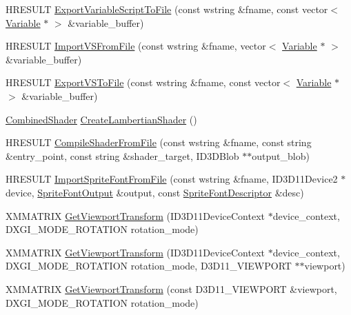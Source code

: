 \begin{DoxyCompactItemize}
H\+R\+E\+S\+U\+LT \hyperlink{namespacemage_a6bbe2c1ce9b49dea0c61ce4eafea6a3d}{Export\+Variable\+Script\+To\+File} (const wstring \&fname, const vector$<$ \hyperlink{structmage_1_1_variable}{Variable} $\ast$ $>$ \&variable\+\_\+buffer)
\item 
H\+R\+E\+S\+U\+LT \hyperlink{namespacemage_ab13ac77392ebda63780e73f720237906}{Import\+V\+S\+From\+File} (const wstring \&fname, vector$<$ \hyperlink{structmage_1_1_variable}{Variable} $\ast$ $>$ \&variable\+\_\+buffer)
\item 
H\+R\+E\+S\+U\+LT \hyperlink{namespacemage_af5780face7eadab7a08f015e3516e137}{Export\+V\+S\+To\+File} (const wstring \&fname, const vector$<$ \hyperlink{structmage_1_1_variable}{Variable} $\ast$ $>$ \&variable\+\_\+buffer)
\item 
\hyperlink{structmage_1_1_combined_shader}{Combined\+Shader} \hyperlink{namespacemage_ab0bd21012fa29244f0f9b3201bebc2a5}{Create\+Lambertian\+Shader} ()
\item 
H\+R\+E\+S\+U\+LT \hyperlink{namespacemage_af63dbc237d243bcad8b6f2c0a9bb9163}{Compile\+Shader\+From\+File} (const wstring \&fname, const string \&entry\+\_\+point, const string \&shader\+\_\+target, I\+D3\+D\+Blob $\ast$$\ast$output\+\_\+blob)
\item 
H\+R\+E\+S\+U\+LT \hyperlink{namespacemage_a08f20ffe7bbb23d861ab2442e2967bcd}{Import\+Sprite\+Font\+From\+File} (const wstring \&fname, I\+D3\+D11\+Device2 $\ast$device, \hyperlink{structmage_1_1_sprite_font_output}{Sprite\+Font\+Output} \&output, const \hyperlink{structmage_1_1_sprite_font_descriptor}{Sprite\+Font\+Descriptor} \&desc)
\item 
X\+M\+M\+A\+T\+R\+IX \hyperlink{namespacemage_a2d37559381f62998ab660694c0e45d68}{Get\+Viewport\+Transform} (I\+D3\+D11\+Device\+Context $\ast$device\+\_\+context, D\+X\+G\+I\+\_\+\+M\+O\+D\+E\+\_\+\+R\+O\+T\+A\+T\+I\+ON rotation\+\_\+mode)
\item 
X\+M\+M\+A\+T\+R\+IX \hyperlink{namespacemage_a07ec7b3cc09d526542d3c5ea7e17595a}{Get\+Viewport\+Transform} (I\+D3\+D11\+Device\+Context $\ast$device\+\_\+context, D\+X\+G\+I\+\_\+\+M\+O\+D\+E\+\_\+\+R\+O\+T\+A\+T\+I\+ON rotation\+\_\+mode, D3\+D11\+\_\+\+V\+I\+E\+W\+P\+O\+RT $\ast$$\ast$viewport)
\item 
X\+M\+M\+A\+T\+R\+IX \hyperlink{namespacemage_a0191746ac9322d40db5863b59624719a}{Get\+Viewport\+Transform} (const D3\+D11\+\_\+\+V\+I\+E\+W\+P\+O\+RT \&viewport, D\+X\+G\+I\+\_\+\+M\+O\+D\+E\+\_\+\+R\+O\+T\+A\+T\+I\+ON rotation\+\_\+mode)
\item 

\end{DoxyCompactItemize}

